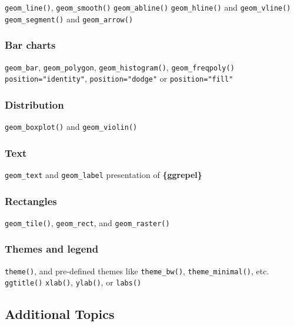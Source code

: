 \documentclass[
]{book}
\begin{document}
\texttt{geom\_line()}, \texttt{geom\_smooth()}
\texttt{geom\_abline()}
\texttt{geom\_hline()} and \texttt{geom\_vline()}
\texttt{geom\_segment()} and \texttt{geom\_arrow()}

\hypertarget{bar-charts}{%
\subsubsection{Bar charts}\label{bar-charts}}

\texttt{geom\_bar}, \texttt{geom\_polygon}, \texttt{geom\_histogram()}, \texttt{geom\_freqpoly()}
\texttt{position="identity"}, \texttt{position="dodge"} or \texttt{position="fill"}

\hypertarget{distribution}{%
\subsubsection{Distribution}\label{distribution}}

\texttt{geom\_boxplot()} and \texttt{geom\_violin()}

\hypertarget{text}{%
\subsubsection{Text}\label{text}}

\texttt{geom\_text} and \texttt{geom\_label}
presentation of \textbf{\{ggrepel\}}

\hypertarget{rectangles}{%
\subsubsection{Rectangles}\label{rectangles}}

\texttt{geom\_tile()}, \texttt{geom\_rect}, and \texttt{geom\_raster()}

\hypertarget{themes-and-legend}{%
\subsubsection{Themes and legend}\label{themes-and-legend}}

\texttt{theme()}, and pre-defined themes like \texttt{theme\_bw()}, \texttt{theme\_minimal()}, etc.
\texttt{ggtitle()}
\texttt{xlab()}, \texttt{ylab()}, or \texttt{labs()}

\hypertarget{additional-topics}{%
\subsection{Additional Topics}\label{additional-topics}}
\end{document}
